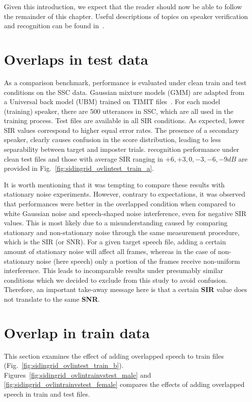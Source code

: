 Given this introduction, we expect that the reader should now be able to follow the remainder of this chapter. 
Useful descriptions of topics on speaker verification and recognition can be found in~\cite{hansen2015SIDmagazine}. 


\section{Overlaps in test data}
\label{sec:ch3_OvlinTest}
As a comparison benchmark, performance is evaluated under clean train and test conditions on the SSC data. 
Gaussian mixture models (GMM) are adapted from a Universal back model (UBM) trained on TIMIT files~\cite{msridentity}. 
For each model (training) speaker, there are 500 utterances in SSC, which are all used in the training process. Test files are available in all SIR conditions. 
As expected, lower SIR values correspond to higher equal error rates. 
The presence of a secondary speaker, clearly causes confusion in the score distribution, leading to less separability between target and imposter trials. 
recognition performance under clean test files and those with average SIR ranging in $+6, +3, 0, -3, -6, -9 dB$ are provided in Fig.~\ref{fig:sidingrid_ovlintest_train_a}. 

It is worth mentioning that it was tempting to compare these results with stationary noise experiments. 
However, contrary to expectations, it was observed that performances were better in the overlapped condition when compared to white Gaussian noise and speech-shaped noise interference, even for negative SIR values. 
This is most likely due to a misunderstanding caused by comparing stationary and non-stationary noise through the same measurement procedure, which is the SIR (or SNR). 
For a given target speech file, adding a certain amount of stationary noise will affect all frames, whereas in the case of non-stationary noise (here speech) only a portion of the frames receive non-uniform interference. 
This leads to incomparable results under presumably similar conditions which we decided to exclude from this study to avoid confusion. 
Therefore, an important take-away message here is that a certain {\bf SIR} value does not translate to the same {\bf SNR}. 


\section{Overlap in train data}
\label{sec:ch3_OvlinTrain}
This section examines the effect of adding overlapped speech to train files (Fig.~\ref{fig:sidingrid_ovlintest_train_b}). 
Figures~\ref{fig:sidingrid_ovlintrainvstest_male} and \ref{fig:sidingrid_ovlintrainvstest_female} compares the effects of adding overlapped speech in train and test files. 

